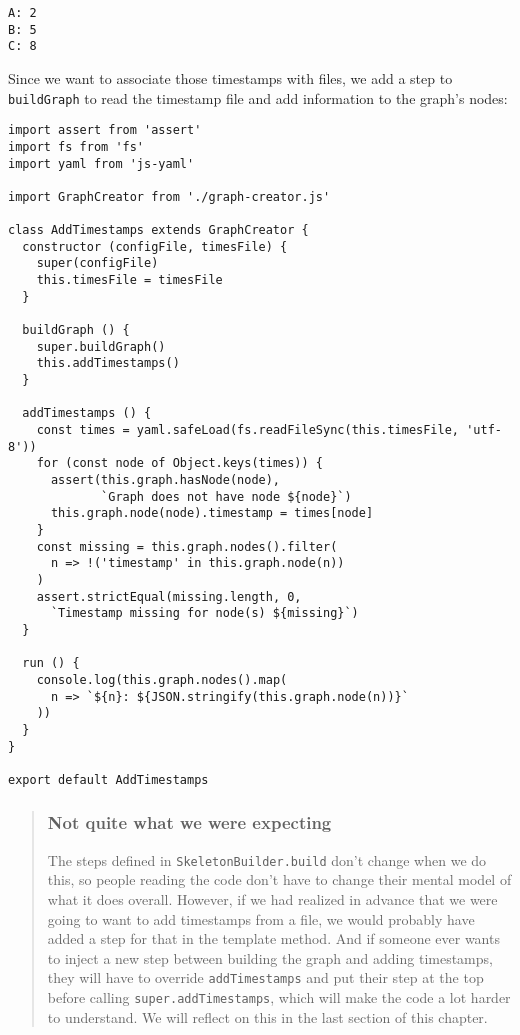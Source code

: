 \documentclass[krantzl]{krantz}
\newenvironment{callout}{\savenotes\begin{tBox}\begin{quotation}\toggletrue{inbox}\renewcommand{\thempfootnote}{\arabic{footnote}}}{\end{quotation}\vspace{\baselineskip}\end{tBox}\togglefalse{inbox}\spewnotes}
\begin{document}
\begin{lstlisting}[frame=single,frameround=tttt]
A: 2
B: 5
C: 8
\end{lstlisting}



Since we want to associate those timestamps with files,
we add a step to \texttt{buildGraph} to read the timestamp file and add information to the graph's nodes:


\begin{lstlisting}[frame=single,frameround=tttt]
import assert from 'assert'
import fs from 'fs'
import yaml from 'js-yaml'

import GraphCreator from './graph-creator.js'

class AddTimestamps extends GraphCreator {
  constructor (configFile, timesFile) {
    super(configFile)
    this.timesFile = timesFile
  }

  buildGraph () {
    super.buildGraph()
    this.addTimestamps()
  }

  addTimestamps () {
    const times = yaml.safeLoad(fs.readFileSync(this.timesFile, 'utf-8'))
    for (const node of Object.keys(times)) {
      assert(this.graph.hasNode(node),
             `Graph does not have node ${node}`)
      this.graph.node(node).timestamp = times[node]
    }
    const missing = this.graph.nodes().filter(
      n => !('timestamp' in this.graph.node(n))
    )
    assert.strictEqual(missing.length, 0,
      `Timestamp missing for node(s) ${missing}`)
  }

  run () {
    console.log(this.graph.nodes().map(
      n => `${n}: ${JSON.stringify(this.graph.node(n))}`
    ))
  }
}

export default AddTimestamps
\end{lstlisting}


\begin{callout}


\subsubsection*{Not quite what we were expecting}


The steps defined in \texttt{SkeletonBuilder.build} don't change when we do this,
so people reading the code don't have to change their mental model of what it does overall.
However,
if we had realized in advance that we were going to want to add timestamps from a file,
we would probably have added a step for that in the template method.
And if someone ever wants to inject a new step between building the graph and adding timestamps,
they will have to override \texttt{addTimestamps} and put their step at the top before calling \texttt{super.addTimestamps},
which will make the code a lot harder to understand.
We will reflect on this in the last section of this chapter.

\end{callout}
\end{document}
